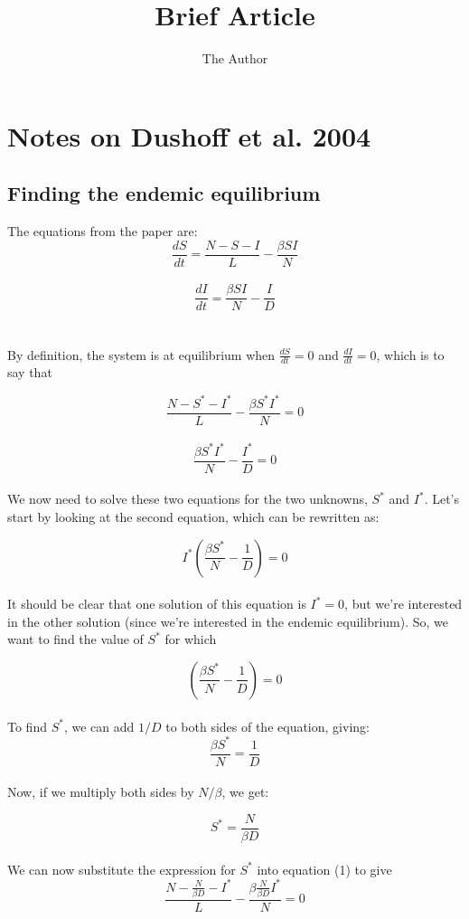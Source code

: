 \documentclass[11pt]{article}
\title{Brief Article}
\author{The Author}
\begin{document}
\section*{Notes on Dushoff et al. 2004}

\subsection*{Finding the endemic equilibrium}

The equations from the paper are:\\

$$
\frac{dS}{dt} = \frac{N-S-I}{L} - \frac{\beta S I}{N}
$$
\\
$$
\frac{dI}{dt} = \frac{\beta S I}{N} - \frac{I}{D}
$$
\\
\\By definition, the system is at equilibrium when $\frac{dS}{dt} = 0$ and $\frac{dI}{dt} = 0$, which is to say that 

\begin{equation}
\frac{N-S^*-I^*}{L} - \frac{\beta S^* I^*}{N} = 0
\end{equation}
\\
\begin{equation}
\frac{\beta S^* I^*}{N} - \frac{I^*}{D} = 0
\end{equation}
\\
We now need to solve these two equations for the two unknowns, $S^*$ and $I^*$. Let's start by looking at the second equation, which can be rewritten as:

$$
I^* \left(\frac{\beta S^*}{N} - \frac{1}{D}\right) = 0
$$
\\
It should be clear that one solution of this equation is $I^*=0$, but we're interested in the other solution (since we're interested in the endemic equilibrium). So, we want to find the value of $S^*$ for which 

$$
\left(\frac{\beta S^*}{N} - \frac{1}{D}\right) = 0
$$
\\
To find $S^*$, we can add $1/D$ to both sides of the equation, giving:
$$
\frac{\beta S^*}{N} = \frac{1}{D}
$$
\\
Now, if we multiply both sides by $N/\beta$, we get:

\begin{equation}
S^* = \frac{N}{\beta D}
\end{equation}
\\
We can now substitute the expression for $S^*$ into equation (1) to give
$$
\frac{N-\frac{N}{\beta D}-I^*}{L} - \frac{\beta \frac{N}{\beta D} I^*}{N} = 0
$$
\\
\end{document}
